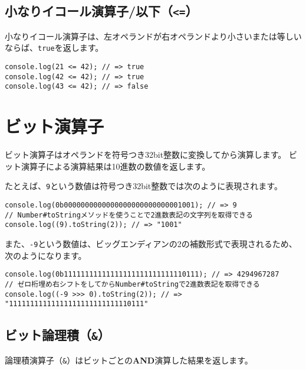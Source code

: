 \hypertarget{less-than-equal}{%
\subsection{\texorpdfstring{小なりイコール演算子/以下（\texttt{\textless{}=}）}{小なりイコール演算子/以下（\textless{}=）}}\label{less-than-equal}}

小なりイコール演算子は、左オペランドが右オペランドより小さいまたは等しいならば、\texttt{true}を返します。

\begin{lstlisting}
console.log(21 <= 42); // => true
console.log(42 <= 42); // => true
console.log(43 <= 42); // => false
\end{lstlisting}

\hypertarget{bit-operator}{%
\section{ビット演算子}\label{bit-operator}}

ビット演算子はオペランドを符号つき32bit整数に変換してから演算します。
ビット演算子による演算結果は10進数の数値を返します。

たとえば、\texttt{9}という数値は符号つき32bit整数では次のように表現されます。

\begin{lstlisting}
console.log(0b0000000000000000000000000001001); // => 9
// Number#toStringメソッドを使うことで2進数表記の文字列を取得できる
console.log((9).toString(2)); // => "1001"
\end{lstlisting}

また、\texttt{-9}という数値は、ビッグエンディアンの2の補数形式で表現されるため、次のようになります。

\begin{lstlisting}
console.log(0b11111111111111111111111111110111); // => 4294967287
// ゼロ桁埋め右シフトをしてからNumber#toStringで2進数表記を取得できる
console.log((-9 >>> 0).toString(2)); // => "11111111111111111111111111110111"
\end{lstlisting}

\hypertarget{bit-and}{%
\subsection{\texorpdfstring{ビット論理積（\texttt{\&}）}{ビット論理積（\&）}}\label{bit-and}}

論理積演算子（\texttt{\&}）はビットごとの\textbf{AND}演算した結果を返します。

